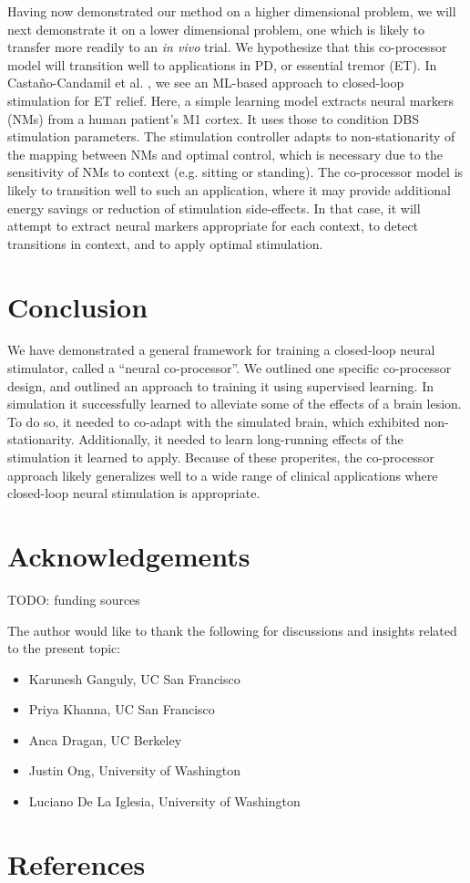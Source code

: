 \documentclass[12pt]{iopart}
\begin{document}
Having now demonstrated our method on a higher dimensional problem, we will next demonstrate
it on a lower dimensional problem, one which is likely to transfer more readily to
an \textit{in vivo} trial. We hypothesize that this co-processor model will transition well
to applications in PD, or essential tremor (ET). In Castaño-Candamil et al. \cite{castano.pd},
we see an ML-based approach to closed-loop stimulation for ET relief. Here, a simple learning
model extracts neural markers (NMs) from a human patient's M1 cortex. It uses those to
condition DBS stimulation parameters. The stimulation controller adapts to non-stationarity
of the mapping between NMs and optimal control, which is necessary due to the sensitivity
of NMs to context (e.g. sitting or standing). The co-processor model is likely to
transition well to such an application, where it may provide additional energy savings
or reduction of stimulation side-effects. In that case, it will attempt to extract neural
markers appropriate for each context, to detect transitions in context, and to apply
optimal stimulation.

\section{Conclusion}
We have demonstrated a general framework for training a closed-loop neural stimulator,
called a ``neural co-processor''. We outlined one specific co-processor design, and
outlined an approach to training it using supervised learning. In simulation it
successfully learned to alleviate some of the effects of a brain lesion. To do so, it
needed to co-adapt with the simulated brain, which exhibited non-stationarity. Additionally,
it needed to learn long-running effects of the stimulation it learned to apply. Because of
these properites, the co-processor approach likely generalizes well to a wide range of
clinical applications where closed-loop neural stimulation is appropriate.

\section{Acknowledgements}
TODO: funding sources

The author would like to thank the following for discussions and insights related to
the present topic:
\begin{itemize}
	\item Karunesh Ganguly, UC San Francisco
	\item Priya Khanna, UC San Francisco
	\item Anca Dragan, UC Berkeley
	\item Justin Ong, University of Washington
	\item Luciano De La Iglesia, University of Washington
\end{itemize}

\section{References}


\end{document}
